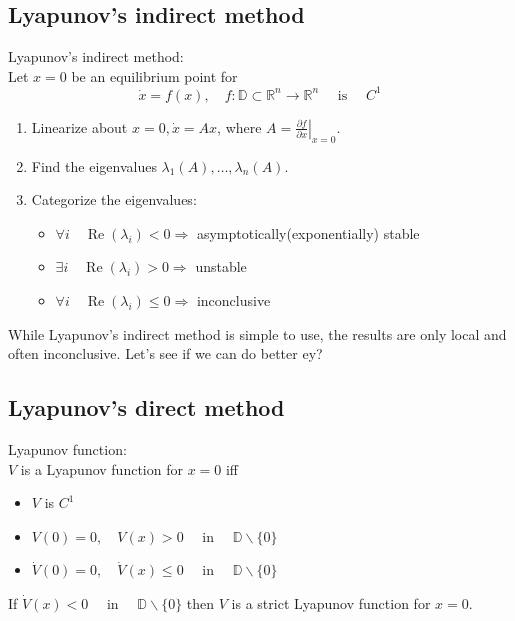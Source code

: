 \subsection{Lyapunov's indirect method}
\begin{tcolorbox}[colback=white, colframe=teal]
\begin{theorem}
    Lyapunov's indirect method:\\
    Let $x = 0$ be an equilibrium point for
    \begin{equation}
        \dot{x}=f(x), \quad f: \mathbb{D} \subset \mathbb{R}^{n} \rightarrow \mathbb{R}^{n} \quad \text { is } \quad C^{1}
    \end{equation}
    \begin{enumerate}[topsep=0pt]
        \item Linearize about $x=0, \dot{x} = Ax$, where $A=\left.\frac{\partial f}{\partial x}\right|_{x=0}$.
        \item Find the eigenvalues $\lambda_{1}(A), \ldots, \lambda_{n}(A)$.
        \item Categorize the eigenvalues:
        \begin{itemize}[topsep=0pt]
            \item $\forall i \quad \operatorname{Re}\left(\lambda_{i}\right)<0 \Rightarrow$ asymptotically(exponentially) stable
            \item $\exists i \quad \operatorname{Re}\left(\lambda_{i}\right)>0 \Rightarrow$ unstable
            \item $\forall i \quad \operatorname{Re}\left(\lambda_{i}\right)\leq 0 \Rightarrow$ inconclusive
        \end{itemize}
    \end{enumerate}
\end{theorem}
\end{tcolorbox}
While Lyapunov's indirect method is simple to use, the results are only local and often inconclusive. Let's see if we can do better ey?

\subsection{Lyapunov's direct method}
\begin{tcolorbox}[colback=white, colframe=teal]
\begin{definition}
    Lyapunov function:\\
    $V$ is a Lyapunov function for $x=0$ iff
    \begin{itemize}[topsep=0pt]
        \item $V$ is $C^1$
        \item $V(0)=0, \quad V(x)>0 \quad \text { in } \quad \mathbb{D} \backslash\{0\}$
        \item $\dot{V}(0)=0, \quad \dot{V}(x) \leq 0 \quad \text { in } \quad \mathbb{D} \backslash\{0\}$
    \end{itemize}
    If $\dot{V}(x) < 0 \quad \text { in } \quad \mathbb{D} \backslash\{0\}$ then $V$ is a strict Lyapunov function for $x=0$.
\end{definition}
\end{tcolorbox}

